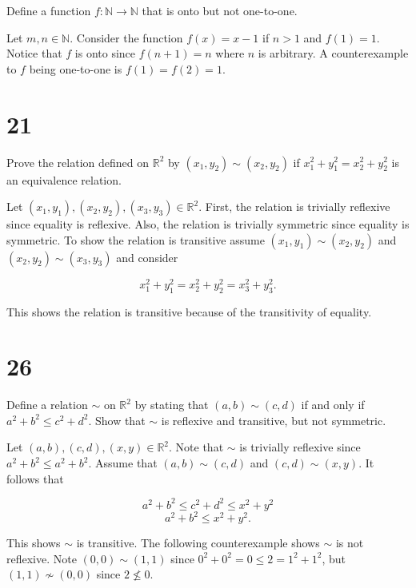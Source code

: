 \documentclass[a4paper]{article}
\begin{document}
\vspace{\baselineskip}

Define a function $f: \mathbb{N} \rightarrow \mathbb{N}$ that is onto but not one-to-one.

\vspace{\baselineskip}

Let $m,n \in \mathbb{N}$. Consider the function $f(x) = x - 1$ if $n > 1$ and $f(1) = 1$. Notice that $f$ is onto since $f(n+1) = n$ where $n$ is arbitrary. A counterexample to $f$ being one-to-one is $f(1) = f(2) = 1$.


\section*{21}

Prove the relation defined on $\mathbb{R}^2$ by $(x_1, y_2) \sim (x_2, y_2)$ if $x_1^2 + y_1^2 = x_2^2 + y_2^2$ is an equivalence relation.

\vspace{\baselineskip}

Let $(x_1, y_1), (x_2, y_2), (x_3, y_3) \in \mathbb{R}^2$. First, the relation is trivially reflexive since equality is reflexive. Also, the relation is trivially symmetric since equality is symmetric. To show the relation is transitive assume $(x_1, y_1) \sim (x_2, y_2)$ and $(x_2, y_2) \sim (x_3, y_3)$ and consider

$$x_1^2 + y_1 ^2 = x_2^2 + y_2^2 = x_3^2 + y_3^2.$$

This shows the relation is transitive because of the transitivity of equality.


\section*{26}

Define a relation $\sim$ on $\mathbb{R}^2$ by stating that $(a,b) \sim (c,d)$ if and only if $a^2 + b^2 \leq c^2 + d^2$. Show that $\sim$ is reflexive and transitive, but not symmetric.

\vspace{\baselineskip}

Let $(a,b), (c,d), (x,y) \in \mathbb{R}^2$. Note that $\sim$ is trivially reflexive since $a^2 + b^2 \leq a^2 + b^2$. Assume that $(a,b) \sim (c,d)$ and $(c,d) \sim (x,y)$. It follows that 

$$a^2 + b^2 \leq c^2 + d^2 \leq x^2 + y^2$$
$$a^2 + b^2 \leq x^2 + y^2.$$

This shows $\sim$ is transitive. The following counterexample shows $\sim$ is not reflexive. Note $(0,0) \sim (1,1)$ since $0^2 + 0^2 = 0 \leq 2 = 1^2 + 1^2$, but $(1,1) \not \sim (0,0)$ since $2 \not \leq 0$.
\end{document}
